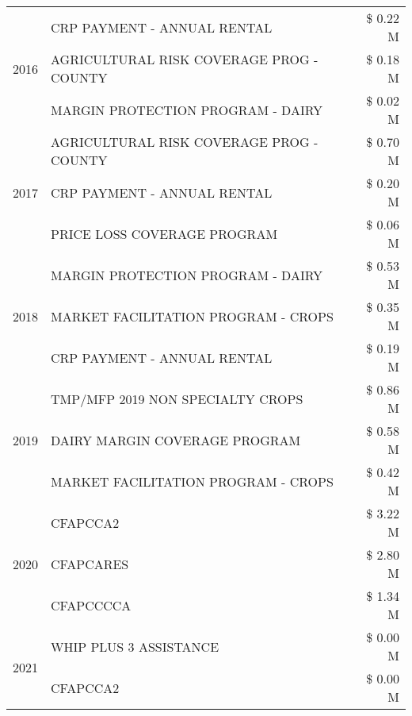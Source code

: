 \begin{tabular}{llr}
\cline{1-3}
\multirow[t]{3}{*}{2016} & CRP PAYMENT - ANNUAL RENTAL & \$ 0.22 M \\
 & AGRICULTURAL RISK COVERAGE PROG - COUNTY & \$ 0.18 M \\
 & MARGIN PROTECTION PROGRAM - DAIRY & \$ 0.02 M \\
\cline{1-3}
\multirow[t]{3}{*}{2017} & AGRICULTURAL RISK COVERAGE PROG - COUNTY & \$ 0.70 M \\
 & CRP PAYMENT - ANNUAL RENTAL & \$ 0.20 M \\
 & PRICE LOSS COVERAGE PROGRAM & \$ 0.06 M \\
\cline{1-3}
\multirow[t]{3}{*}{2018} & MARGIN PROTECTION PROGRAM - DAIRY & \$ 0.53 M \\
 & MARKET FACILITATION PROGRAM - CROPS & \$ 0.35 M \\
 & CRP PAYMENT - ANNUAL RENTAL & \$ 0.19 M \\
\cline{1-3}
\multirow[t]{3}{*}{2019} & TMP/MFP 2019 NON SPECIALTY CROPS & \$ 0.86 M \\
 & DAIRY MARGIN COVERAGE PROGRAM & \$ 0.58 M \\
 & MARKET FACILITATION PROGRAM - CROPS & \$ 0.42 M \\
\cline{1-3}
\multirow[t]{3}{*}{2020} & CFAPCCA2 & \$ 3.22 M \\
 & CFAPCARES & \$ 2.80 M \\
 & CFAPCCCCA & \$ 1.34 M \\
\cline{1-3}
\multirow[t]{2}{*}{2021} & WHIP PLUS 3 ASSISTANCE & \$ 0.00 M \\
 & CFAPCCA2 & \$ 0.00 M \\
\cline{1-3}
\bottomrule
\end{tabular}
